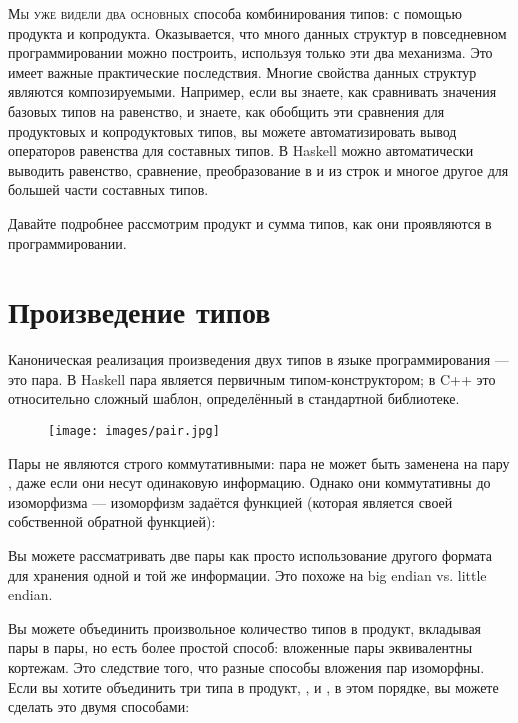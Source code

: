 

\lettrine[lhang=0.17]{М}{ы уже видели два основных} способа комбинирования типов: с помощью продукта и копродукта. Оказывается, что много данных структур в повседневном программировании можно построить, используя только эти два механизма. Это имеет важные практические последствия. Многие свойства данных структур являются композируемыми. Например, если вы знаете, как сравнивать значения базовых типов на равенство, и знаете, как обобщить эти сравнения для продуктовых и копродуктовых типов, вы можете автоматизировать вывод операторов равенства для составных типов. В Haskell можно автоматически выводить равенство, сравнение, преобразование в и из строк и многое другое для большей части составных типов.

Давайте подробнее рассмотрим продукт и сумма типов, как они проявляются в программировании.

\section{Произведение типов}

Каноническая реализация произведения двух типов в языке программирования — это пара. В Haskell пара является первичным типом-конструктором; в C++ это относительно сложный шаблон, определённый в стандартной библиотеке.

\begin{figure}[H]
  \centering
  \texttt{[image: images/pair.jpg]}
\end{figure}

\noindent
Пары не являются строго коммутативными: пара  не может быть заменена на пару , даже если они несут одинаковую информацию. Однако они коммутативны до изоморфизма — изоморфизм задаётся функцией  (которая является своей собственной обратной функцией):

Вы можете рассматривать две пары как просто использование другого формата для хранения одной и той же информации. Это похоже на big endian vs. little endian.

Вы можете объединить произвольное количество типов в продукт, вкладывая пары в пары, но есть более простой способ: вложенные пары эквивалентны кортежам. Это следствие того, что разные способы вложения пар изоморфны. Если вы хотите объединить три типа в продукт, ,  и , в этом порядке, вы можете сделать это двумя способами:

